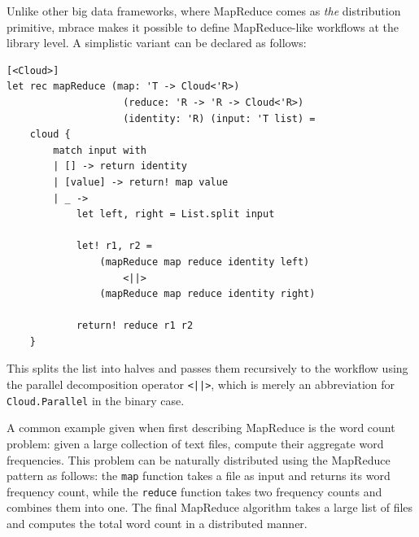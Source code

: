 \documentclass[9pt,a4paper]{article}
\newcommand{\mbrace}{mbrace}
\begin{document}
Unlike other big data frameworks, where MapReduce comes as \emph{the} distribution primitive,
\mbrace{} makes it possible to define MapReduce-like workflows at the library level. 
A simplistic variant can be declared as follows:
\begin{lstlisting}
[<Cloud>]
let rec mapReduce (map: 'T -> Cloud<'R>) 
                    (reduce: 'R -> 'R -> Cloud<'R>) 
                    (identity: 'R) (input: 'T list) =
    cloud {
        match input with
        | [] -> return identity
        | [value] -> return! map value
        | _ ->
            let left, right = List.split input
 
            let! r1, r2 =
                (mapReduce map reduce identity left)
                    <||>
                (mapReduce map reduce identity right)
 
            return! reduce r1 r2
    }
\end{lstlisting}
This splits the list into halves and passes them 
recursively to the workflow using the parallel decomposition operator \texttt{<||>},
which is merely an abbreviation for \texttt{Cloud.Parallel} in the binary case.

A common example given when first describing MapReduce is the word count problem:
given a large collection of text files, compute their aggregate word frequencies.
This problem can be naturally distributed using the MapReduce pattern as follows:
the \texttt{map} function takes a file as input and returns its word frequency
count, while the \texttt{reduce} function takes two frequency counts and combines 
them into one.
The final MapReduce algorithm takes a large list of files and computes the total word
count in a distributed manner.
\end{document}
